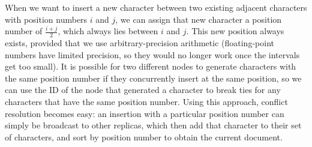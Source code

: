 When we want to insert a new character between two existing adjacent characters with position numbers $i$ and $j$, we can assign that new character a position number of $\frac{i+j}{2}$, which always lies between $i$ and $j$.
This new position always exists, provided that we use arbitrary-precision arithmetic (floating-point numbers have limited precision, so they would no longer work once the intervals get too small).
It is possible for two different nodes to generate characters with the same position number if they concurrently insert at the same position, so we can use the ID of the node that generated a character to break ties for any characters that have the same position number.
Using this approach, conflict resolution becomes easy: an insertion with a particular position number can simply be broadcast to other replicas, which then add that character to their set of characters, and sort by position number to obtain the current document.

